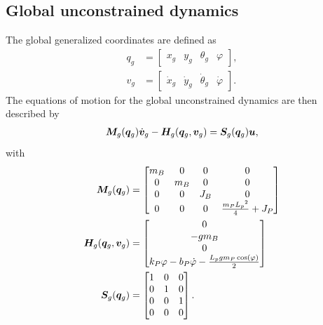 \documentclass[../DC2017114Bouma.tex]{subfiles}
\begin{document}
\subsection*{Global unconstrained dynamics}
The global generalized coordinates are defined as
\begin{align}
q_g &= \begin{bmatrix}
x_g & y_g & \theta_g & \varphi
\end{bmatrix},\\
v_g &= \begin{bmatrix}
\dot{x}_g & \dot{y}_g & \dot{\theta}_g & \dot{\varphi}
\end{bmatrix}.
\end{align}
The equations of motion for the global unconstrained dynamics are then described by
\begin{align}
{\boldsymbol{M}}_g({\boldsymbol{q}}_g)\dot{{\boldsymbol{v}}}_g - {\boldsymbol{H}}_g({\boldsymbol{q}}_g,{\boldsymbol{v}}_g) = {\boldsymbol{S}}_g({\boldsymbol{q}}_g){\boldsymbol{u}},
\end{align}
with
\begin{align}
{\boldsymbol{M}}_g({\boldsymbol{q}}_g) &= \begin{bmatrix}
m_B & 0 & 0 & 0\\ 0 & m_B & 0 & 0\\ 0 & 0 & J_B & 0\\ 0 & 0 & 0 & \frac{m_P{L_p}^2}{4}+J_P
\end{bmatrix} \\
{\boldsymbol{H}}_g({\boldsymbol{q}}_g,{\boldsymbol{v}}_g) &= \begin{bmatrix}
0\\ -gm_B\\ 0\\ k_P\varphi -b_P\dot{\varphi}-\frac{L_pgm_P\cos\left(\varphi \right)}{2}
\end{bmatrix} \\
{\boldsymbol{S}}_g({\boldsymbol{q}}_g) &= \begin{bmatrix}
1 & 0 & 0 \\
0 & 1 & 0 \\
0 & 0 & 1 \\
0 & 0 & 0 
\end{bmatrix}.
\end{align}
\end{document}
